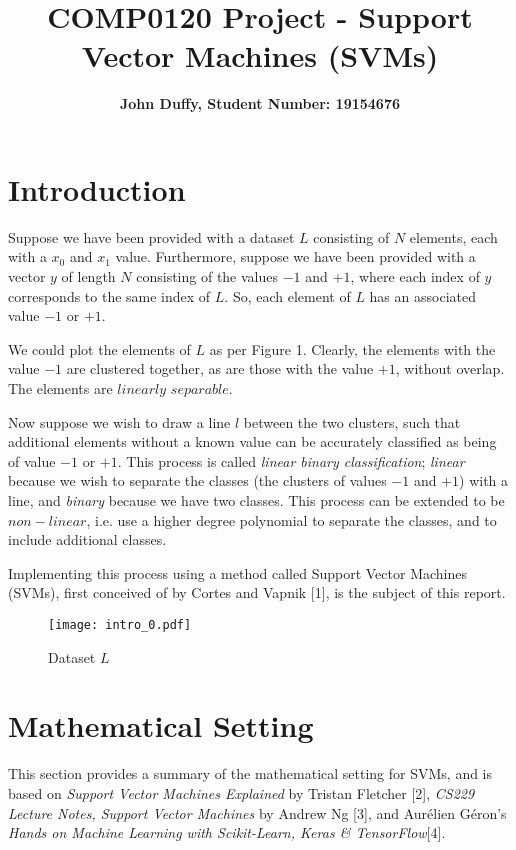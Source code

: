 \documentclass[10pt, a4paper]{amsart}
\title{COMP0120 Project - Support Vector Machines (SVM\MakeLowercase{s})}
\author{\textbf{John Duffy, Student Number: 19154676}}
\begin{document}
\maketitle

\section{Introduction}

Suppose we have been provided with a dataset $L$ consisting of $N$ elements, each with a $x_0$ and $x_1$ value. Furthermore, suppose we have been provided with a vector $y$ of length $N$ consisting of the values $-1$ and $+1$, where each index of $y$ corresponds to the same index of $L$. So, each element of $L$ has an associated value $-1$ or $+1$.

We could plot the elements of $L$ as per Figure 1. Clearly, the elements with the value $-1$ are clustered together, as are those with the value $+1$, without overlap. The elements are $linearly$  $separable$.

Now suppose we wish to draw a line $l$ between the two clusters, such that additional elements without a known value can be accurately classified as being of value $-1$ or $+1$. This process is called \emph{linear binary classification}; \emph{linear} because we wish to separate the classes (the clusters of values $-1$ and $+1$) with a line, and \emph{binary} because we have two classes. This process can be extended to be $non-linear$, i.e. use a higher degree polynomial to separate the classes, and to include additional classes.  

Implementing this process using a method called Support Vector Machines (SVMs), first conceived of by Cortes and Vapnik [1], is the subject of this report.

\begin{figure}
	\centering	
	\texttt{[image: intro\_0.pdf]}
	\caption{Dataset $L$}
\end{figure}

\section{Mathematical Setting}

This section provides a summary of the mathematical setting for SVMs, and is based on \emph{Support Vector Machines Explained} by Tristan Fletcher [2], \emph{CS229 Lecture Notes, Support Vector Machines} by Andrew Ng [3], and Aur\'{e}lien G\'{e}ron's \emph{Hands on Machine Learning with Scikit-Learn, Keras \& TensorFlow}[4].
\end{document}
